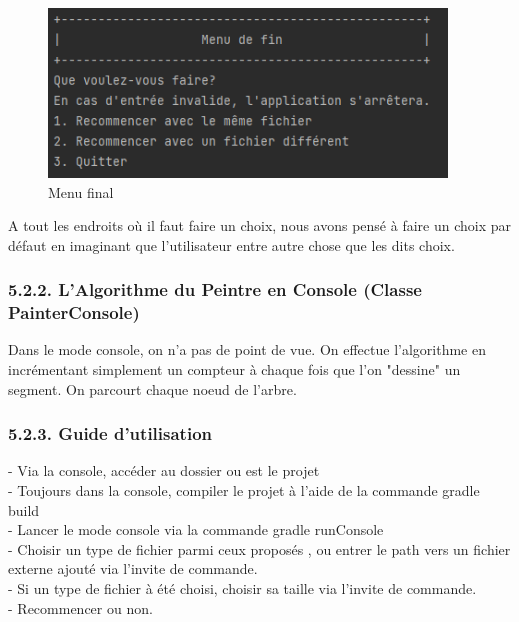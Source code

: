 \documentclass[a4paper,12pt]{report}	%
\begin{document}
\begin{figure}[H]
\begin{center}
  \includegraphics[width=400px]{end.png}
  \caption{Menu final}\label{fig:PERT}
\end{center}
\end{figure}
\indent A tout les endroits où il faut faire un choix, nous avons pensé à faire un choix par défaut en imaginant que l'utilisateur entre autre chose que les dits choix.\\

    {\subsubsection*{5.2.2. L'Algorithme du Peintre en Console (Classe PainterConsole)}}
    Dans le mode console, on n'a pas de point de vue. On effectue l'algorithme en incrémentant simplement un compteur à chaque fois que l'on "dessine" un segment. On parcourt chaque noeud de l'arbre.\\
	
    {\subsubsection*{5.2.3. Guide d'utilisation}}
	    - Via la console, accéder au dossier ou est le projet\\
	    - Toujours dans la console, compiler le projet à l'aide de la commande gradle build \\
	    - Lancer le mode console via la commande gradle runConsole\\
\indent - Choisir un type de fichier parmi ceux proposés , ou entrer le path vers un fichier externe ajouté via l'invite de commande.\\
\indent - Si un type de fichier à été choisi, choisir sa taille via l'invite de commande.\\
\indent - Recommencer ou non.\\
	
\end{document}
